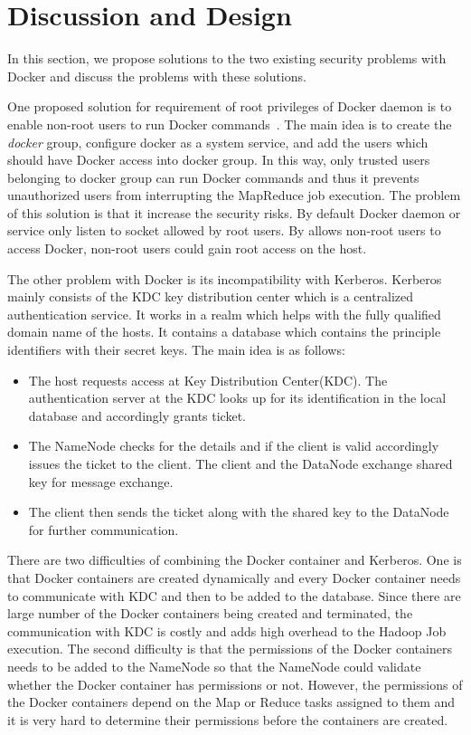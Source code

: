 \section{Discussion and Design}
\label{sec:design}
\iffalse
Evaluation (don't forget to interpret your data)
\fi
In this section, we propose solutions to the two existing security problems with Docker and discuss the problems with these solutions.

One proposed solution for requirement of root privileges of Docker daemon is to enable non-root users to run Docker commands~\cite{non-root}. The main idea is to create the {\em docker} group, configure docker as a system service, and add the users which should have Docker access into docker group. In this way, only trusted users belonging to docker group can run Docker commands and thus it prevents unauthorized users from interrupting the MapReduce job execution. The problem of this solution is that it increase the security risks. By default Docker daemon or service only listen to socket allowed by root users. By allows non-root users to access Docker, non-root users could gain root access on the host.

The other problem with Docker is its incompatibility with Kerberos. Kerberos mainly consists of the KDC key distribution center which is a centralized authentication service. It works in a realm which helps with the fully qualified domain name of the hosts. It contains a database which
contains the principle identifiers with their secret keys. The main idea is as follows:
\begin{itemize}
\item {The host requests access at Key Distribution Center(KDC). The authentication server at the KDC looks up for its identification in the local database and accordingly grants ticket.}
\item {The NameNode checks for the details and if the client is valid accordingly issues the ticket to the client. The client and the DataNode exchange shared key for message exchange.}
\item {The client then sends the ticket along with the shared key to the DataNode for further communication.}
\end{itemize}

There are two difficulties of combining the Docker container and Kerberos. One is that Docker containers are created dynamically and every Docker container needs to communicate with KDC and then to be added to the database. Since there are large number of the Docker containers being created and terminated, the communication with KDC is costly and adds high overhead to the Hadoop Job execution. The second difficulty is that the permissions of the Docker containers needs to be added to the NameNode so that the NameNode could validate whether the Docker container has permissions or not. However, the permissions of the Docker containers depend on the Map or Reduce tasks assigned to them and it is very hard to determine their permissions before the containers are created.

